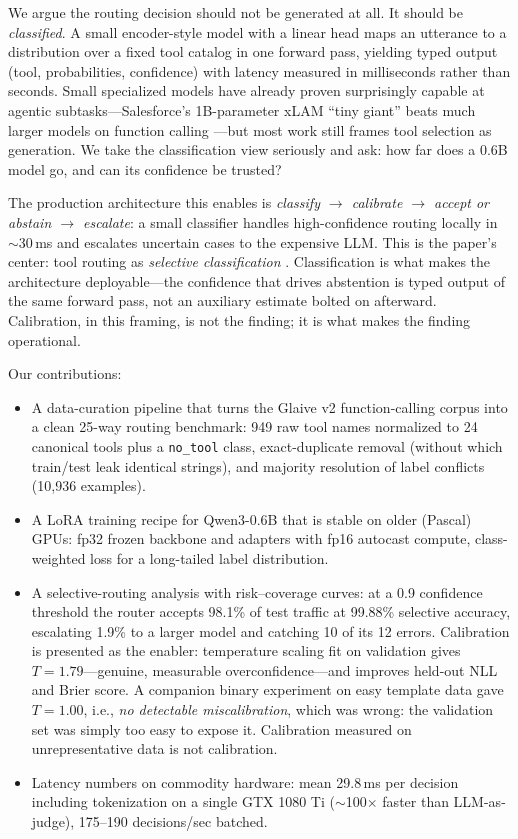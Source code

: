 \documentclass{article}
\begin{document}
We argue the routing decision should not be generated at all. It should be
\emph{classified}. A small encoder-style model with a linear head maps an
utterance to a distribution over a fixed tool catalog in one forward pass,
yielding typed output (tool, probabilities, confidence) with latency measured
in milliseconds rather than seconds. Small specialized models have already
proven surprisingly capable at agentic subtasks---Salesforce's 1B-parameter
xLAM ``tiny giant'' beats much larger models on function calling
\citep{zhang2024xlam}---but most work still frames tool selection as
generation. We take the classification view seriously and ask: how far does a
0.6B model go, and can its confidence be trusted?

The production architecture this enables is \emph{classify $\to$ calibrate
$\to$ accept or abstain $\to$ escalate}: a small classifier handles
high-confidence routing locally in $\sim$30\,ms and escalates uncertain cases
to the expensive LLM. This is the paper's center: tool routing as
\emph{selective classification} \citep{geifman2017selective}. Classification
is what makes the architecture deployable---the confidence that drives
abstention is typed output of the same forward pass, not an auxiliary
estimate bolted on afterward. Calibration, in this framing, is not the
finding; it is what makes the finding operational.

Our contributions:
\begin{itemize}
  \item A data-curation pipeline that turns the Glaive v2 function-calling
  corpus \citep{glaive2024} into a clean 25-way routing benchmark: 949 raw
  tool names normalized to 24 canonical tools plus a \texttt{no\_tool} class,
  exact-duplicate removal (without which train/test leak identical strings),
  and majority resolution of label conflicts (10,936 examples).
  \item A LoRA \citep{hu2022lora} training recipe for Qwen3-0.6B
  \citep{qwen2025report} that is stable on older (Pascal) GPUs: fp32 frozen
  backbone and adapters with fp16 autocast compute, class-weighted loss for a
  long-tailed label distribution.
  \item A selective-routing analysis with risk--coverage curves: at a 0.9
  confidence threshold the router accepts 98.1\% of test traffic at 99.88\%
  selective accuracy, escalating 1.9\% to a larger model and catching 10 of
  its 12 errors. Calibration is presented as the enabler: temperature scaling
  \citep{guo2017calibration} fit on validation gives $T=1.79$---genuine,
  measurable overconfidence---and improves held-out NLL and Brier score. A
  companion binary experiment on easy template data gave $T=1.00$, i.e.,
  \emph{no detectable miscalibration}, which was wrong: the validation set was
  simply too easy to expose it. Calibration measured on unrepresentative data
  is not calibration.
  \item Latency numbers on commodity hardware: mean 29.8\,ms per decision
  including tokenization on a single GTX 1080 Ti ($\sim$100$\times$ faster
  than LLM-as-judge), 175--190 decisions/sec batched.
\end{itemize}
\end{document}
